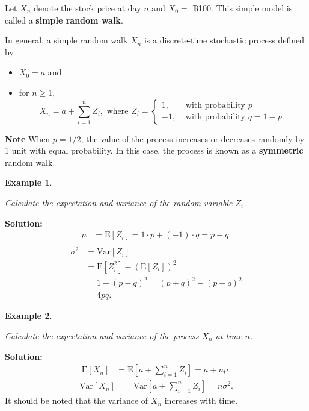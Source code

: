 \documentclass[landscape, 20pt]{extreport}
\theoremstyle{definition}
\theoremstyle{definition}
\newtheorem{example}{Example}[chapter]
\theoremstyle{definition}
\theoremstyle{definition}
\theoremstyle{remark}
\begin{document}
Let \(X_n\) denote the stock price at day \(n\) and \(X_0 =\) ฿100. This
simple model is called a \textbf{simple random walk}.

In general, a simple random walk \(X_n\) is a discrete-time stochastic
process defined by

\begin{itemize}
\item
  \(X_0 = a\) and
\item
  for \(n \ge1\),
  \[X_n = a + \sum_{i=1}^n  Z_i, \text{ where } Z_i = \begin{cases}
      1, & \text{ with probability } p  \\
      -1, & \text{ with probability } q =  1- p.
   \end{cases}\]
\end{itemize}

\textbf{Note} When \(p = 1/2\), the value of the process increases or decreases
randomly by 1 unit with equal probability. In this case, the process is
known as a \textbf{symmetric} random walk.

\newpage \begin{example}
\protect\hypertarget{exm:unlabeled-div-62}{}\label{exm:unlabeled-div-62}

\emph{Calculate the expectation and variance of the random
variable \(Z_i\).}

\end{example}

\textbf{Solution:} \[\begin{aligned}
    \mu &= \mathrm{E}[Z_i] = 1\cdot p + (-1) \cdot q = p - q.\\\end{aligned}\]
\[\begin{aligned}
    \sigma^2 &= \mathrm{Var}[Z_i] \\
            &=\mathrm{E}[Z_i^2] - (\mathrm{E}[Z_i] )^2 \\
            &= 1 - (p-q)^2  = (p+q)^2 - (p-q)^2\\
            &= 4pq.\end{aligned}\]

\newpage \begin{example}
\protect\hypertarget{exm:unlabeled-div-63}{}\label{exm:unlabeled-div-63}

\emph{Calculate the expectation and variance of the process
\(X_n\) at time \(n\).}

\end{example}

\textbf{Solution:} \[\begin{aligned}
     \mathrm{E}[X_n] &=  \mathrm{E}[a + \sum_{i=1}^n Z_i] = a + n\mu.\end{aligned}\]
\[\begin{aligned}
    \mathrm{Var}[X_n]&= \mathrm{Var}[a + \sum_{i=1}^n Z_i]  = n \sigma^2.\end{aligned}\]
It should be noted that the variance of \(X_n\) increases with time.
\end{document}
